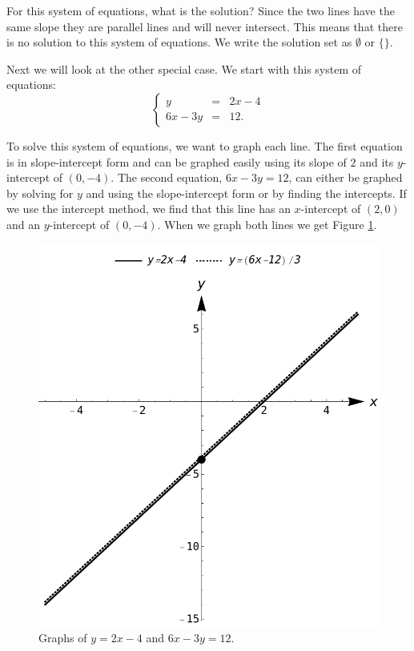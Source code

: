 For this system of equations, what is the solution? Since the two lines have the same slope they are parallel lines and will never intersect. This means that there is no solution to this system of equations. We write the solution set as $\emptyset$ or $\{ \}$.	
	



Next we will look at the other special case. We start with this system
of equations:
\[\left\{ \begin{array}{rcl} y & = & 2x-4 \\6x-3y  & = &  12. \end{array} \right.  \]	

To solve this system of equations, we want to graph each line. The first equation is in slope-intercept form and can be graphed easily using its slope of $2$ and its $y$-intercept of $(0,-4)$. The second equation, $6x-3y = 12$, can either be graphed by solving for $y$ and using the slope-intercept form or by finding the intercepts. If we use the intercept method, we find that this line has an $x$-intercept of $(2,0)$ and an $y$-intercept of $(0,-4)$. When we graph both lines we get Figure \ref{fig_Systems_lin_eq_4}.

\begin{figure}[h!]
	\centering
	\includegraphics[scale=0.6]{fig_Systems_lin_eq_4}
	\caption{Graphs of $y=2x-4$ and $6x-3y = 12$.}
	\label{fig_Systems_lin_eq_4}
\end{figure}	

